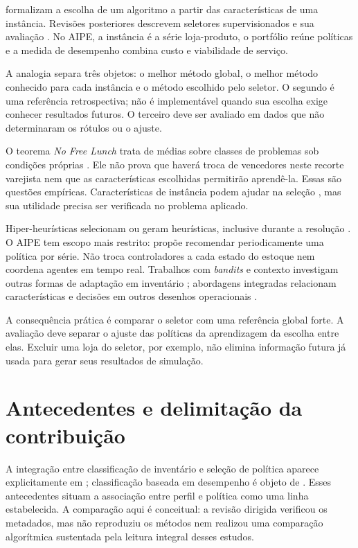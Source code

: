 \citet{Rice1976AlgorithmSelection} formalizam a escolha de um algoritmo a partir das características de uma instância. Revisões posteriores descrevem seletores supervisionados e sua avaliação \citep{Kotthoff2014AlgorithmSelection,Kerschke2019AutomatedAlgorithmSelection}. No AIPE, a instância é a série loja-produto, o portfólio reúne políticas e a medida de desempenho combina custo e viabilidade de serviço.

A analogia separa três objetos: o melhor método global, o melhor método conhecido para cada instância e o método escolhido pelo seletor. O segundo é uma referência retrospectiva; não é implementável quando sua escolha exige conhecer resultados futuros. O terceiro deve ser avaliado em dados que não determinaram os rótulos ou o ajuste.

O teorema \textit{No Free Lunch} trata de médias sobre classes de problemas sob condições próprias \citep{Wolpert1997NoFreeLunch}. Ele não prova que haverá troca de vencedores neste recorte varejista nem que as características escolhidas permitirão aprendê-la. Essas são questões empíricas. Características de instância podem ajudar na seleção \citep{Kerschke2019ELASelection}, mas sua utilidade precisa ser verificada no problema aplicado.

Hiper-heurísticas selecionam ou geram heurísticas, inclusive durante a resolução \citep{Drake2020SelectionHyperHeuristics,Dokeroglu2024HyperHeuristics}. O AIPE tem escopo mais restrito: propõe recomendar periodicamente uma política por série. Não troca controladores a cada estado do estoque nem coordena agentes em tempo real. Trabalhos com \textit{bandits} e contexto investigam outras formas de adaptação em inventário \citep{Preil2022BanditInventory,ContextualRL2024SupplyChain}; abordagens integradas relacionam características e decisões em outros desenhos operacionais \citep{Qi2023EndToEndInventory}.

A consequência prática é comparar o seletor com uma referência global forte. A avaliação deve separar o ajuste das políticas da aprendizagem da escolha entre elas. Excluir uma loja do seletor, por exemplo, não elimina informação futura já usada para gerar seus resultados de simulação.

\section{Antecedentes e delimitação da contribuição}

A integração entre classificação de inventário e seleção de política aparece explicitamente em \citet{Mohammaditabar2012Integrated}; classificação baseada em desempenho é objeto de \citet{SheikhZadeh2021PBIC}. Esses antecedentes situam a associação entre perfil e política como uma linha estabelecida. A comparação aqui é conceitual: a revisão dirigida verificou os metadados, mas não reproduziu os métodos nem realizou uma comparação algorítmica sustentada pela leitura integral desses estudos.

